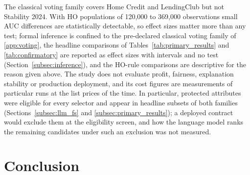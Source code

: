 \documentclass[final,5p,twocolumn]{elsarticle}
\begin{document}
The classical voting family covers Home Credit and LendingClub but not Stability 2024. With HO populations of 120,000 to 369,000 observations small AUC differences are statistically detectable, so effect sizes matter more than any test; formal inference is confined to the pre-declared classical voting family of \ref{app:voting}, the headline comparisons of Tables~\ref{tab:primary_results} and \ref{tab:confirmatory} are reported as effect sizes with intervals and no test (Section~\ref{subsec:inference}), and the HO-rule comparisons are descriptive for the reason given above. The study does not evaluate profit, fairness, explanation stability or production deployment, and its cost figures are measurements of particular runs at the list prices of the time. In particular, protected attributes were eligible for every selector and appear in headline subsets of both families (Sections~\ref{subsec:llm_fs} and \ref{subsec:primary_results}); a deployed contract would exclude them at the eligibility screen, and how the language model ranks the remaining candidates under such an exclusion was not measured.


\section{Conclusion}
\label{sec:conclusion}
\end{document}
